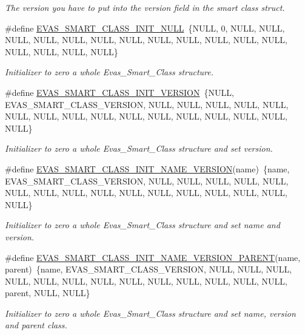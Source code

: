 \begin{DoxyCompactItemize}
\begin{DoxyCompactList}\small\item\em The version you have to put into the version field in the smart class struct. \item\end{DoxyCompactList}\item 
\#define \hyperlink{group__Evas__Smart__Group_ga223f5d420c1e22275cd6490cd77c85f0}{EVAS\_\-SMART\_\-CLASS\_\-INIT\_\-NULL}~\{NULL, 0, NULL, NULL, NULL, NULL, NULL, NULL, NULL, NULL, NULL, NULL, NULL, NULL, NULL, NULL, NULL, NULL\}
\begin{DoxyCompactList}\small\item\em Initializer to zero a whole Evas\_\-Smart\_\-Class structure. \item\end{DoxyCompactList}\item 
\#define \hyperlink{group__Evas__Smart__Group_gaaa610a135c79167162405b56cffe8562}{EVAS\_\-SMART\_\-CLASS\_\-INIT\_\-VERSION}~\{NULL, EVAS\_\-SMART\_\-CLASS\_\-VERSION, NULL, NULL, NULL, NULL, NULL, NULL, NULL, NULL, NULL, NULL, NULL, NULL, NULL, NULL, NULL, NULL\}
\begin{DoxyCompactList}\small\item\em Initializer to zero a whole Evas\_\-Smart\_\-Class structure and set version. \item\end{DoxyCompactList}\item 
\#define \hyperlink{group__Evas__Smart__Group_gaff2bbd5bb79e51ad8d31f98106caff77}{EVAS\_\-SMART\_\-CLASS\_\-INIT\_\-NAME\_\-VERSION}(name)~\{name, EVAS\_\-SMART\_\-CLASS\_\-VERSION, NULL, NULL, NULL, NULL, NULL, NULL, NULL, NULL, NULL, NULL, NULL, NULL, NULL, NULL, NULL, NULL\}
\begin{DoxyCompactList}\small\item\em Initializer to zero a whole Evas\_\-Smart\_\-Class structure and set name and version. \item\end{DoxyCompactList}\item 
\#define \hyperlink{group__Evas__Smart__Group_ga653b7bf36c2c87bd38d8126e11a4671d}{EVAS\_\-SMART\_\-CLASS\_\-INIT\_\-NAME\_\-VERSION\_\-PARENT}(name, parent)~\{name, EVAS\_\-SMART\_\-CLASS\_\-VERSION, NULL, NULL, NULL, NULL, NULL, NULL, NULL, NULL, NULL, NULL, NULL, NULL, NULL, parent, NULL, NULL\}
\begin{DoxyCompactList}\small\item\em Initializer to zero a whole Evas\_\-Smart\_\-Class structure and set name, version and parent class. \item\end{DoxyCompactList}\item 

\end{DoxyCompactItemize}
